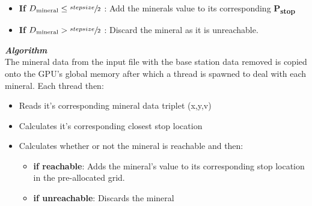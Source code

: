 \documentclass[11pt]{IEEEtran}
\begin{document}
  \begin{itemize}
  \item \textbf{If $ D\textsubscript{mineral} \leq \sfrac{stepsize}{2} $} : Add the minerals value to its corresponding \textbf{P\textsubscript{stop}}
  \item \textbf{If $ D\textsubscript{mineral} > \sfrac{stepsize}{2} $} : Discard the mineral as it is unreachable.\\
  \end{itemize}

\textit{\textbf{Algorithm}}\\[1\baselineskip] 
The mineral data from the input file with the base station data removed is copied onto the GPU's global memory after which a thread is spawned to deal with each mineral. Each thread then:
  \begin{itemize}
  \item Reads it's corresponding mineral data triplet (x,y,v) 
  \item Calculates it's corresponding closest stop location
  \item Calculates whether or not the mineral is reachable and then:
    \begin{itemize}
	\item \textbf{if reachable}: Adds the mineral's value to its corresponding stop location in the pre-allocated grid.
	\item \textbf{if unreachable}: Discards the mineral \\
    \end{itemize}
  \end{itemize}
\end{document}
